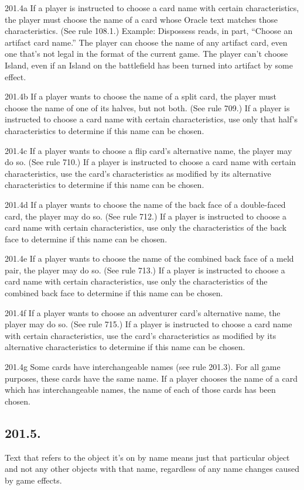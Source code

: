 201.4a If a player is instructed to choose a card name with certain characteristics, the player must choose the name of a card whose Oracle text matches those characteristics. (See rule 108.1.)
Example: Dispossess reads, in part, “Choose an artifact card name.” The player can choose the name of any artifact card, even one that’s not legal in the format of the current game. The player can’t choose Island, even if an Island on the battlefield has been turned into artifact by some effect.

201.4b If a player wants to choose the name of a split card, the player must choose the name of one of its halves, but not both. (See rule 709.) If a player is instructed to choose a card name with certain characteristics, use only that half’s characteristics to determine if this name can be chosen.

201.4c If a player wants to choose a flip card’s alternative name, the player may do so. (See rule 710.) If a player is instructed to choose a card name with certain characteristics, use the card’s characteristics as modified by its alternative characteristics to determine if this name can be chosen.

201.4d If a player wants to choose the name of the back face of a double-faced card, the player may do so. (See rule 712.) If a player is instructed to choose a card name with certain characteristics, use only the characteristics of the back face to determine if this name can be chosen.

201.4e If a player wants to choose the name of the combined back face of a meld pair, the player may do so. (See rule 713.) If a player is instructed to choose a card name with certain characteristics, use only the characteristics of the combined back face to determine if this name can be chosen.

201.4f If a player wants to choose an adventurer card’s alternative name, the player may do so. (See rule 715.) If a player is instructed to choose a card name with certain characteristics, use the card’s characteristics as modified by its alternative characteristics to determine if this name can be chosen.

201.4g Some cards have interchangeable names (see rule 201.3). For all game purposes, these cards have the same name. If a player chooses the name of a card which has interchangeable names, the name of each of those cards has been chosen.

\subsection*{201.5.}
Text that refers to the object it’s on by name means just that particular object and not any other objects with that name, regardless of any name changes caused by game effects.

